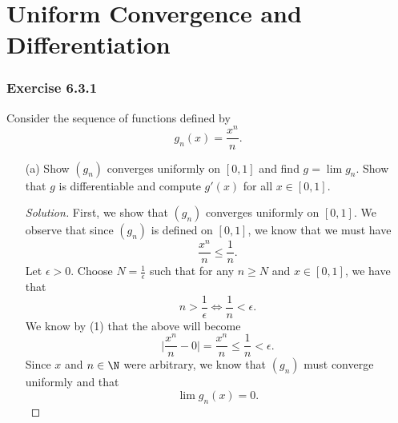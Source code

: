 \section{Uniform Convergence and Differentiation}

\subsubsection{Exercise 6.3.1} Consider the sequence of functions defined by
\[  g_n(x) = \frac{ x^n  }{ n  }. \]
\begin{enumerate}
    \item[(a)] Show \( (g_n)  \) converges uniformly on \( [0,1]  \) and find \( g = \lim g_n  \). Show that \( g  \) is differentiable and compute \( g'(x)  \) for all \( x \in [0,1]  \).
        \begin{proof}[Solution]
            First, we show that \( (g_n)  \) converges uniformly on \( [0,1] \). We observe that since \( (g_n)  \) is defined on \( [0,1]  \), we know that we must have
            \[  \frac{ x^n  }{ n  } \leq \frac{ 1 }{ n }. \tag{1} \]
            Let \( \epsilon > 0  \). Choose \( N = \frac{ 1 }{ \epsilon  }  \) such that for any \( n \geq N  \) and \( x \in [0,1] \), we have that 
            \[ n > \frac{ 1 }{ \epsilon  } \iff \frac{ 1 }{ n } < \epsilon. \]
            We know by (1) that the above will become
            \[   \Big| \frac{ x^n }{ n } - 0  \Big|   = \frac{ x^n  }{ n } \leq \frac{ 1 }{ n } < \epsilon.  \]
            Since \( x  \) and \( n \in \N  \) were arbitrary, we know that \( (g_n)  \) must converge uniformly and that 
            \[  \lim g_n(x) = 0. \]
           

\end{proof}
\end{enumerate}
